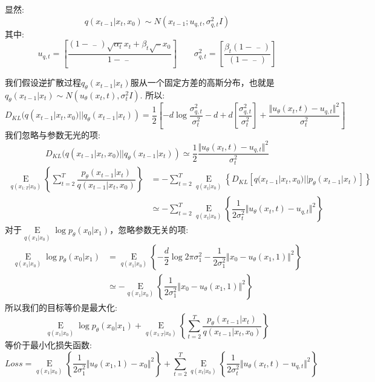 \documentclass[withoutpreface,bwprint]{cumcmthesis} %
\begin{document}
	显然:
	$$
		q(x_{t-1}|x_t,x_0) \sim N(x_{t-1}; u_{q,t}, \sigma_{q,t}^2I)
	$$
	其中:
	$$
		u_{q,t}=\left[ \dfrac{\left(1-\mathop{\alpha_{t-1}}\limits^{-} \right)\sqrt{\alpha_{t}}x_t+\beta_{t} \sqrt{\mathop{\alpha_{t-1}}\limits^{-}} x_0}{1-\mathop{\alpha_{t}}\limits^{-}} \right]   \quad \quad \sigma_{q,t}^2=\left[ \dfrac{  \beta_{t}\left( 1 - \mathop{\alpha_{t-1}}\limits^{-}  \right) }{\left( 1-\mathop{\alpha_{t}}\limits^{-} \right) } \right]
	$$
	
	我们假设逆扩散过程$q_{\theta}(x_{t-1}|x_{t})$服从一个固定方差的高斯分布，也就是$q_{\theta}(x_{t-1}|x_{t}) \sim N(u_{\theta}(x_t,t),\sigma_t^2I)$.
	所以:
	$$
			D_{KL}(	q(x_{t-1}|x_t,x_0) || q_{\theta}(x_{t-1}|x_{t}) ) = \dfrac{1}{2}\left[- d\log\dfrac{\sigma_{q,t}^2}{\sigma_t^2}-d + d\left[ \dfrac{\sigma_{q,t}^2}{\sigma_t^2}\right]+ \dfrac{\Vert u_{\theta}(x_t,t)- u_{q,t} \Vert^2}{\sigma_t^2} \right]
	$$
	我们忽略与参数无光的项:
	$$
		D_{KL}(	q(x_{t-1}|x_t,x_0) || q_{\theta}(x_{t-1}|x_{t}) ) \simeq \dfrac{1}{2} \dfrac{\Vert u_{\theta}(x_t,t)- u_{q,t} \Vert^2}{\sigma_t^2}
	$$
	\begin{align*}
		\mathop{E}\limits_{ q(x_{1:T}|x_0) } \left\{  
		\sum_{t=2}^{T} \dfrac{p_{\theta}(x_{t-1}|x_{t})}{q(x_{t-1}|x_t,x_0)}
		\right\}
		& = - \sum_{t=2}^{T}
			\mathop{E}\limits_{ q(x_{t}|x_0) } \left\{
				D_{KL}\left[ q(x_{t-1}|x_t,x_0)||p_{\theta}(x_{t-1}|x_{t})\right]
			\right\}\\
		& \simeq - \sum_{t=2}^{T}
		\mathop{E}\limits_{ q(x_{t}|x_0) } \left\{
			\dfrac{1}{2 \sigma_t^2 } \Vert u_{\theta}(x_t,t)- u_{q,t} \Vert^2
		\right\}
	\end{align*}
	对于$\mathop{E}\limits_{ q(x_{1}|x_0) } \log  p_{\theta}(x_{0}|x_{1})$，忽略参数无关的项:
	\begin{align*}
		\mathop{E}\limits_{ q(x_{1}|x_0) } \log  p_{\theta}(x_{0}|x_{1}) & =  \mathop{E}\limits_{ q(x_{1}|x_0) } \left\{
				 -\dfrac{d}{2} \log 2\pi \sigma_1^2 -\dfrac{1}{2\sigma_1^2}\Vert x_0 - u_{\theta}(x_1,1) \Vert^2
		\right\}\\
		& \simeq - \mathop{E}\limits_{ q(x_{1}|x_0) } \left\{
				\dfrac{1}{2\sigma_1^2}\Vert x_0 - u_{\theta}(x_1,1) \Vert^2
		\right\}
	\end{align*}
	所以我们的目标等价是最大化:
	$$
		\mathop{E}\limits_{ q(x_{1}|x_0) } \log  p_{\theta}(x_{0}|x_{1}) + \mathop{E}\limits_{ q(x_{1:T}|x_0) } \left\{  
		\sum_{t=2}^{T} \dfrac{p_{\theta}(x_{t-1}|x_{t})}{q(x_{t-1}|x_t,x_0)}
		\right\}
	$$
	等价于最小化损失函数:
	$$
		Loss=\mathop{E}\limits_{ q(x_{1}|x_0) } \left\{
		\dfrac{1}{2\sigma_1^2}\Vert u_{\theta}(x_1,1) -x_0  \Vert^2
		\right\} + \sum_{t=2}^{T}
		\mathop{E}\limits_{ q(x_{t}|x_0) } \left\{
		\dfrac{1}{2 \sigma_t^2 } \Vert u_{\theta}(x_t,t)- u_{q,t} \Vert^2
		\right\}
	$$
\end{document}
